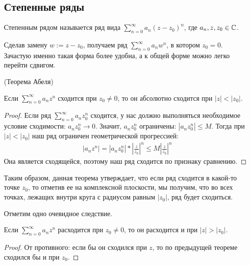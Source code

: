 \subsection{Степенные ряды}
\begin{conj}
    Степенным рядом называется ряд вида $\sum\limits_{n=0}^\infty a_n(z - z_0)^n$, где $a_n, z, z_0 \in \mathbb{C}$.
\end{conj}
\begin{notice}
    Сделав замену $w := z - z_0$, получаем ряд $\sum\limits_{n=0}^\infty a_n w^n$, в котором $z_0 = 0$. 
    Зачастую именно такая форма более удобна, а к общей форме можно легко перейти сдвигом.
\end{notice}

\vspace*{5mm}

\begin{theorem} (Теорема Абеля)

    Если $\sum\limits_{n=0}^\infty a_n z^n$ сходится при $z_0 \neq 0$, то он абсолютно сходится при $|z| < |z_0|$.    
\end{theorem}
\begin{proof}
    Если ряд $\sum\limits_{n=0}^\infty a_n z_0^n$ сходится, у нас должно выполняться необходимое условие сходимости: $a_nz_0^n \to 0$.
    Значит, $a_nz_0^n$ ограничены: $|a_nz_0^n| \leqslant M$. 
    Тогда при $|z| < |z_0|$ наш ряд ограничен геометрической прогрессией:
    \begin{gather*}
        |a_nz^n| = |a_nz_0^n| * |\frac{z}{z_0}|^n \leqslant M|\frac{z}{z_0}|^n
    \end{gather*}
    Она является сходящейся, поэтому наш ряд сходится по признаку сравнению.
\end{proof}

Таким образом, данная теорема утверждает, что если ряд сходится в какой-то точке $z_0$, то отметив ее на комплексной плоскости, мы получим, что во всех точках, лежащих внутри круга с радиусом равным $|z_0|$, ряд будет сходиться.

Отметим одно очевидное следствие.

\begin{follow}
    Если $\sum\limits_{n=0}^\infty a_n z^n$ расходится при $z_0 \neq 0$, то он расходится и при $|z| > |z_0|$.
\end{follow}
\begin{proof}
    От противного: если бы он сходился при $z$, то по предыдущей теореме сходился бы и при $z_0$.
\end{proof}

